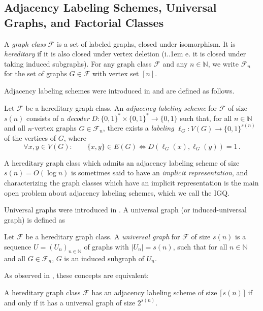 \documentclass{theoretics}
\makeatletter
\newcommand{\zo}{\{0,1\}}
\newcommand{\cF}{\ensuremath{\mathcal{F}}}
\newcommand{\bN}{\ensuremath{\mathbb{N}}}
\newcommand*\ie{i.\kern.1em e.\@\xspace} %
\makeatother
\begin{document}
\subsection{Adjacency Labeling Schemes, Universal Graphs, and Factorial Classes}

A \emph{graph class} $\cF$ is a set of labeled graphs, closed under isomorphism. It is
\emph{hereditary} if it is also closed under vertex deletion (\ie it is closed under taking induced
subgraphs). For any graph class $\cF$ and any $n \in \bN$, we write $\cF_n$ for the set of graphs $G
\in \cF$ with vertex set $[n]$.

Adjacency labeling schemes were introduced in \cite{Mul89, KNR92} and are defined as follows.

\begin{definition}
Let $\cF$ be a hereditary graph class. An \emph{adjacency labeling scheme} for $\cF$ of size $s(n)$
consists of a \emph{decoder} $D : \zo^* \times \zo^* \to \zo$ such that, for all $n \in \bN$ and all
$n$-vertex graphs $G \in \cF_n$, there exists a \emph{labeling} $\ell_G : V(G) \to \zo^{s(n)}$ of the
vertices of $G$, where
\[
  \forall x,y \in V(G) : \qquad \{x,y\} \in E(G) \iff D(\ell_G(x), \ell_G(y)) = 1 \,.
\]
\end{definition}
A hereditary graph class which admits an adjacency labeling scheme of size $s(n) = O(\log n)$ is
sometimes said to have an \emph{implicit representation}, and characterizing the graph classes which
have an implicit representation is the main open problem about adjacency labeling schemes, which we
call the IGQ.

Universal graphs were introduced in \cite{Rado64}. A universal graph (or induced-universal graph) is
defined as

\begin{definition}
Let $\cF$ be a hereditary graph class. A \emph{universal graph} for $\cF$ of size $s(n)$ is a
sequence $U = (U_n)_{n \in \bN}$ of graphs with $|U_n| = s(n)$, such that for all $n \in \bN$ and all $G \in
\cF_n$, $G$ is an induced subgraph of $U_n$.
\end{definition}

As observed in \cite{KNR92}, these concepts are equivalent:
\begin{proposition}
A hereditary graph class $\cF$ has an adjacency labeling scheme of size $\lceil s(n) \rceil$ if and
only if it has a universal graph of size $2^{s(n)}$.
\end{proposition}
\end{document}
